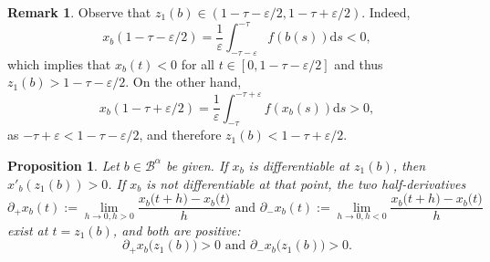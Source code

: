 \documentclass[a4paper,11pt]{article}
\theoremstyle{plain}
\newtheorem{prop}[thm]{Proposition}
\theoremstyle{definition}
\newtheorem{remark}[thm]{Remark}
\theoremstyle{definition}
\newcommand{\dd}{\mathrm{d}}
\numberwithin{equation}{section}
\begin{document}
\begin{remark}\label{rem:boundontau}
Observe that $z_1(b) \in (1-\tau-\varepsilon/2,1-\tau+\varepsilon/2)$. Indeed,
\[
    x_b(1-\tau-\varepsilon/2) = \frac{1}{\varepsilon} \int_{-\tau-\varepsilon}^{-\tau} f(b(s))\dd s <0,
\]
which implies that $x_b(t)<0$ for all $t\in[0,1-\tau-\varepsilon/2]$ and thus $z_1(b)> 1-\tau-\varepsilon/2$. On the other hand,
\[
    x_b(1-\tau+\varepsilon/2) = \frac{1}{\varepsilon} \int_{-\tau}^{-\tau+\varepsilon} f(x_b(s))\dd s >0,
\]
as $-\tau + \varepsilon < 1-\tau-\varepsilon/2$, and therefore $z_1(b)<1-\tau+\varepsilon/2$.
\end{remark}

\begin{prop}\label{deriv_x}
    Let $b\in \mathcal{B}^\alpha$ be given. If $x_b$ is differentiable at $z_1(b)$, then $x'_b(z_1(b))>0$. If $x_b$ is not differentiable at that point, the two half-derivatives 
	\begin{equation*}
		\partial_+x_b(t):=\lim_{h\to 0, h>0} \dfrac{x_b\big(t+h\big)-x_b\big(t\big)}{h} \text{ and } \partial_- x_b(t) := \lim_{h\to 0, h<0} \dfrac{x_b\big(t+h\big)-x_b\big(t\big)}{h} 
	\end{equation*}
	exist at $t=z_1(b)$, and both are positive:
    \begin{equation*}
	    \partial_+ x_b\big(z_1(b)\big)>0 \text{ and } \partial_- x_b\big(z_1(b)\big)>0.
    \end{equation*}
\end{prop}
\end{document}
